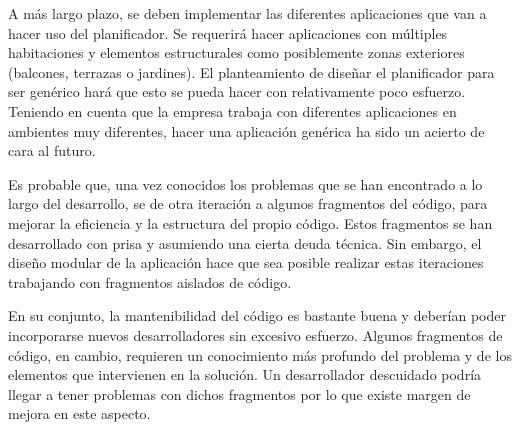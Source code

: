 A más largo plazo, se deben implementar las diferentes aplicaciones que van a hacer uso del planificador. Se requerirá hacer aplicaciones con múltiples habitaciones y elementos estructurales como posiblemente zonas exteriores (balcones, terrazas o jardines). El planteamiento de diseñar el planificador para ser genérico hará que esto se pueda hacer con relativamente poco esfuerzo. Teniendo en cuenta que la empresa trabaja con diferentes aplicaciones en ambientes muy diferentes, hacer una aplicación genérica ha sido un acierto de cara al futuro.

Es probable que, una vez conocidos los problemas que se han encontrado a lo largo del desarrollo, se de otra iteración a algunos fragmentos del código, para mejorar la eficiencia y la estructura del propio código. Estos fragmentos se han desarrollado con prisa y asumiendo una cierta deuda técnica. Sin embargo, el diseño modular de la aplicación hace que sea posible realizar estas iteraciones trabajando con fragmentos aislados de código.

En su conjunto, la mantenibilidad del código es bastante buena y deberían poder incorporarse nuevos desarrolladores sin excesivo esfuerzo. Algunos fragmentos de código, en cambio, requieren un conocimiento más profundo del problema y de los elementos que intervienen en la solución. Un desarrollador descuidado podría llegar a tener problemas con dichos fragmentos por lo que existe margen de mejora en este aspecto.
